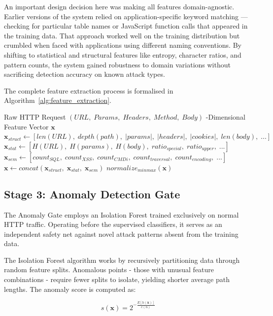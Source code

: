 \documentclass[journal,onecolumn]{IEEEtran}
\begin{document}
An important design decision here was making all features domain-agnostic. Earlier versions of the system relied on application-specific keyword matching --- checking for particular table names or JavaScript function calls that appeared in the training data. That approach worked well on the training distribution but crumbled when faced with applications using different naming conventions. By shifting to statistical and structural features like entropy, character ratios, and pattern counts, the system gained robustness to domain variations without sacrificing detection accuracy on known attack types.

The complete feature extraction process is formalised in Algorithm~\ref{alg:feature_extraction}.

\begin{algorithm}[h]
\caption{Domain-Agnostic Feature Extraction}
\label{alg:feature_extraction}
\begin{algorithmic}[1]
\Require Raw HTTP Request $(URL,\; Params,\; Headers,\; Method,\; Body)$
-Dimensional Feature Vector $\mathbf{x}$
\State $\mathbf{x}_{struct} \leftarrow [len(URL),\; depth(path),\; |params|,\; |headers|,\; |cookies|,\; len(body),\; ...]$
\State $\mathbf{x}_{stat} \leftarrow [H(URL),\; H(params),\; H(body),\; ratio_{special},\; ratio_{upper},\; ...]$
\State $\mathbf{x}_{sem} \leftarrow [count_{SQL},\; count_{XSS},\; count_{CMDi},\; count_{traversal},\; count_{encoding},\; ...]$
\State $\mathbf{x} \leftarrow concat(\mathbf{x}_{struct},\; \mathbf{x}_{stat},\; \mathbf{x}_{sem})$
\State \Return $normalize_{minmax}(\mathbf{x})$
\end{algorithmic}
\end{algorithm}

\subsection{Stage 3: Anomaly Detection Gate}
The Anomaly Gate employs an Isolation Forest trained exclusively on normal HTTP traffic. Operating before the supervised classifiers, it serves as an independent safety net against novel attack patterns absent from the training data.

The Isolation Forest algorithm works by recursively partitioning data through random feature splits. Anomalous points - those with unusual feature combinations - require fewer splits to isolate, yielding shorter average path lengths. The anomaly score is computed as:

\begin{equation}
s(\mathbf{x}) = 2^{-\frac{E[h(\mathbf{x})]}{c(n)}}
\end{equation}
\end{document}

